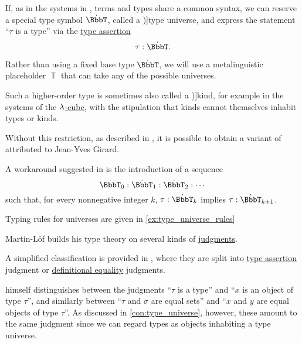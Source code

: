 \begin{concept}\label{con:type_universe}
  If, as in the systems in , terms and types share a common syntax, we can reserve a special type symbol \( \syn\BbbT \), called a \term[en=universe (\cite[\S 1.3]{UnivalentFoundationsProgram2013HoTT})]{type universe}, and express the statement \enquote{\( \tau \) is a type} via the \hyperref[def:type_assertion]{type assertion}
  \begin{equation*}
    \tau: \syn\BbbT.
  \end{equation*}

  Rather than using a fixed base type \( \syn\BbbT \), we will use a metalinguistic placeholder \( \BbbT \) that can take any of the possible universes.

  Such a higher-order type is sometimes also called a \term[en=kind (\cite[def. 5.2]{Barendregt1992LambdaCalculiWithTypes})]{kind}, for example in the systems of the \hyperref[def:lambda_cube]{\( {\mathrm \lambda} \)-cube}, with the stipulation that kinds cannot themselves inhabit types or kinds.

  Without this restriction, as described in , it is possible to obtain a variant of  attributed to Jean-Yves Girard.

  A workaround suggested in \cite[\S 1.3]{UnivalentFoundationsProgram2013HoTT} is the introduction of a sequence
  \begin{equation*}
    \syn\BbbT_0: \syn\BbbT_1: \syn\BbbT_2: \cdots
  \end{equation*}
  such that, for every nonnegative integer \( k \), \( \tau: \syn\BbbT_k \) implies \( \tau: \syn\BbbT_{k+1} \).
\end{concept}
\begin{comments}
  \item Typing rules for universes are given in \cref{ex:type_universe_rules}
\end{comments}

\begin{remark}\label{rem:typing_judgments}
  Martin-L\"of builds his type theory on several kinds of \hyperref[con:judgment]{judgments}.

  A simplified classification is provided in \cite[19]{UnivalentFoundationsProgram2013HoTT}, where they are split into \hyperref[def:type_assertion]{type assertion} judgment or \hyperref[con:equality]{definitional equality} judgments.

   himself distinguishes between the judgments \enquote{\( \tau \) is a type} and \enquote{\( x \) is an object of type \( \tau \)}, and similarly between \enquote{\( \tau \) and \( \sigma \) are equal sets} and \enquote{\( x \) and \( y \) are equal objects of type \( \tau \)}. As discussed in \cref{con:type_universe}, however, these amount to the same judgment since we can regard types as objects inhabiting a type universe.
\end{remark}

